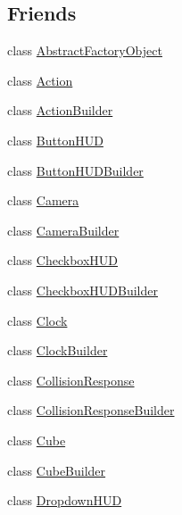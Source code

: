 \subsection*{Friends}
\begin{DoxyCompactItemize}
\item 
class \mbox{\hyperlink{classnjli_1_1_world_factory_a59f5fcb165066624f68fb5417aa3586e}{Abstract\+Factory\+Object}}
\item 
class \mbox{\hyperlink{classnjli_1_1_world_factory_a2df56bce875115e30eee589571642e33}{Action}}
\item 
class \mbox{\hyperlink{classnjli_1_1_world_factory_a6a5fbb3d9afc8ecdda801eb0baa72618}{Action\+Builder}}
\item 
class \mbox{\hyperlink{classnjli_1_1_world_factory_a19c07f330269ab1d6555234c92605d56}{Button\+H\+UD}}
\item 
class \mbox{\hyperlink{classnjli_1_1_world_factory_a8c026aede787124ffee5dfcadef572ef}{Button\+H\+U\+D\+Builder}}
\item 
class \mbox{\hyperlink{classnjli_1_1_world_factory_ad8bd9afbbd7af19d996da80e9d25890d}{Camera}}
\item 
class \mbox{\hyperlink{classnjli_1_1_world_factory_a7752fee1bd2b982e8f23fedc42a80a2c}{Camera\+Builder}}
\item 
class \mbox{\hyperlink{classnjli_1_1_world_factory_a0aab48d603790a3ca2c4d7dd7ab9e519}{Checkbox\+H\+UD}}
\item 
class \mbox{\hyperlink{classnjli_1_1_world_factory_a218892def884e56259183e1a5999c6e5}{Checkbox\+H\+U\+D\+Builder}}
\item 
class \mbox{\hyperlink{classnjli_1_1_world_factory_a5ae5b1616a53c84525df7446cb4014e2}{Clock}}
\item 
class \mbox{\hyperlink{classnjli_1_1_world_factory_acb9ae88f448a010684fe7bda1f015d62}{Clock\+Builder}}
\item 
class \mbox{\hyperlink{classnjli_1_1_world_factory_aada10170113bd62fd216e56e169c30bb}{Collision\+Response}}
\item 
class \mbox{\hyperlink{classnjli_1_1_world_factory_a2c7af76413a94496eea595a1640f050f}{Collision\+Response\+Builder}}
\item 
class \mbox{\hyperlink{classnjli_1_1_world_factory_a8faee6be39d1c71eee071a7874631653}{Cube}}
\item 
class \mbox{\hyperlink{classnjli_1_1_world_factory_a662086a007f158ad6a1a9cd4968b6f05}{Cube\+Builder}}
\item 
class \mbox{\hyperlink{classnjli_1_1_world_factory_aff628788b98fce5e2ba538f3d1548af4}{Dropdown\+H\+UD}}

\end{DoxyCompactItemize}
